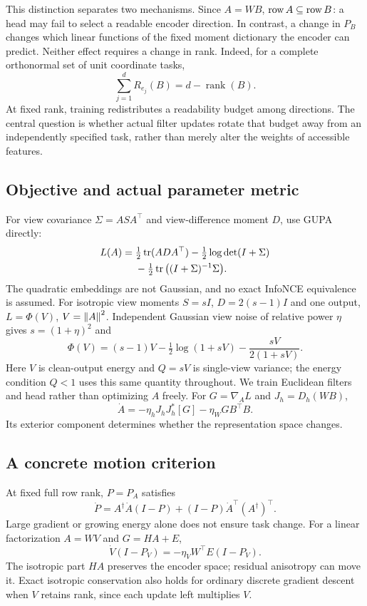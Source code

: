 This distinction separates two mechanisms. Since $A=WB$, $\operatorname{row} A\subseteq\operatorname{row} B$: a head may fail to select a readable encoder direction. In contrast, a change in $P_B$ changes which linear functions of the fixed moment dictionary the encoder can predict. Neither effect requires a change in rank. Indeed, for a complete orthonormal set of unit coordinate tasks,
\begin{equation}
 \sum_{j=1}^{d}R_{e_j}(B)=d-\operatorname{rank}(B).
\end{equation}
At fixed rank, training redistributes a readability budget among directions. The central question is whether actual filter updates rotate that budget away from an independently specified task, rather than merely alter the weights of accessible features.

\subsection{Objective and actual parameter metric}
For view covariance $\Sigma=ASA^\top$ and view-difference moment $D$, use GUPA~\cite{torralba2026theory} directly:
\begin{align}
 L(A)={}&\tfrac12\operatorname{tr}(ADA^\top)-\tfrac12\log\det(I+\Sigma)\nonumber\\
 &-\tfrac12\operatorname{tr}\big((I+\Sigma)^{-1}\Sigma\big).
 \label{main:gupa}
\end{align}
The quadratic embeddings are not Gaussian, and no exact InfoNCE equivalence is assumed. For isotropic view moments $S=sI$, $D=2(s-1)I$ and one output, $L=\Phi(V)$, $V=\left\lVert A\right\rVert^2$. Independent Gaussian view noise of relative power $\eta$ gives $s=(1+\eta)^2$ and
\begin{equation}
 \Phi(V)=(s-1)V-\tfrac12\log(1+sV)-\frac{sV}{2(1+sV)}.
\end{equation}
Here $V$ is clean-output energy and $Q=sV$ is single-view variance; the energy condition $Q<1$ uses this same quantity throughout. We train Euclidean filters and head rather than optimizing $A$ freely. For $G=\nabla_AL$ and $J_h=D_h(WB)$,
\begin{equation}
 \dot A=-\eta_hJ_hJ_h^*[G]-\eta_WGB^\top B.
 \label{main:parameter-mobility}
\end{equation}
Its exterior component determines whether the representation space changes.

\subsection{A concrete motion criterion}
At fixed full row rank, $P=P_A$ satisfies
\begin{equation}
 \dot P=A^\dagger\dot A(I-P)+(I-P)\dot A^\top(A^\dagger)^\top.
\end{equation}
Large gradient or growing energy alone does not ensure task change. For a linear factorization $A=WV$ and $G=HA+E$,
\begin{equation}
 \dot V(I-P_V)=-\eta_VW^\top E(I-P_V).
 \label{main:linear-normal}
\end{equation}
The isotropic part $HA$ preserves the encoder space; residual anisotropy can move it. Exact isotropic conservation also holds for ordinary discrete gradient descent when $V$ retains rank, since each update left multiplies $V$.

